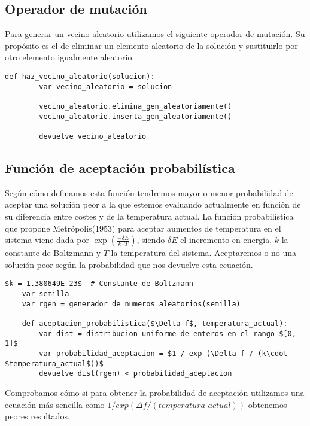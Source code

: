 \begin{minipage}{\textwidth}
	\subsection{Operador de mutación}
	
	Para generar un vecino aleatorio utilizamos el siguiente operador de mutación. Su propósito es el de eliminar un elemento aleatorio
	de la solución y sustituirlo por otro elemento igualmente aleatorio.

	\begin{lstlisting}[mathescape=true,caption={Operador de mutación para el algoritmo de Enfriamiento Simulado.},captionpos=b]
	def haz_vecino_aleatorio(solucion):
		var vecino_aleatorio = solucion

		vecino_aleatorio.elimina_gen_aleatoriamente()
		vecino_aleatorio.inserta_gen_aleatoriamente()

		devuelve vecino_aleatorio
	\end{lstlisting}
\end{minipage}

\begin{minipage}{\textwidth}
	\subsection{Función de aceptación probabilística}

	Según cómo definamos esta función tendremos mayor o menor probabilidad de aceptar una solución
	peor a la que estemos evaluando actualmente en función de su diferencia entre costes y de la temperatura
	actual. La función probabilística que propone Metrópolis(1953) para aceptar aumentos de temperatura
	en el sistema viene dada por $\exp (\frac{-\delta E}{k\cdot T})$, siendo $\delta E$ el incremento en energía,
	$k$ la constante de Boltzmann y $T$ la temperatura del sistema.\cite{Tema5MH} Aceptaremos o no una solución peor según la probabilidad
	que nos devuelve esta ecuación.

	\begin{lstlisting}[mathescape=true,caption={Función de aceptación probabilística para el algoritmo de Enfriamiento Simulado.},captionpos=b]
	$k = 1.380649E-23$	# Constante de Boltzmann
	var semilla
	var rgen = generador_de_numeros_aleatorios(semilla)
	
	def aceptacion_probabilistica($\Delta f$, temperatura_actual):
		var dist = distribucion uniforme de enteros en el rango $[0, 1]$
		var probabilidad_aceptacion = $1 / exp (\Delta f / (k\cdot $temperatura_actual$))$
		devuelve dist(rgen) < probabilidad_aceptacion
	\end{lstlisting}

	Comprobamos cómo si para obtener la probabilidad de aceptación utilizamos una ecuación
	más sencilla como $1 / exp (\Delta f / (temperatura\_actual))$ obtenemos peores resultados.
\end{minipage}

